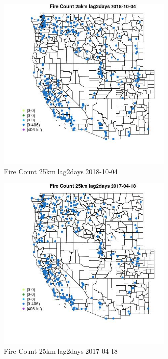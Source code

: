 \begin{figure} 
\centering  
\includegraphics[width=0.77\textwidth]{Code_Outputs/Report_ML_input_PM25_Step4_part_f_de_duplicated_aveswNAs_MapObsFire_Count_25km_lag2days2018-10-04.jpg} 
\caption{\label{fig:Report_ML_input_PM25_Step4_part_f_de_duplicated_aveswNAsMapObsFire_Count_25km_lag2days2018-10-04}Fire Count 25km lag2days 2018-10-04} 
\end{figure} 
 

\clearpage 

\begin{figure} 
\centering  
\includegraphics[width=0.77\textwidth]{Code_Outputs/Report_ML_input_PM25_Step4_part_f_de_duplicated_aveswNAs_MapObsFire_Count_25km_lag2days2017-04-18.jpg} 
\caption{\label{fig:Report_ML_input_PM25_Step4_part_f_de_duplicated_aveswNAsMapObsFire_Count_25km_lag2days2017-04-18}Fire Count 25km lag2days 2017-04-18} 
\end{figure} 
 

